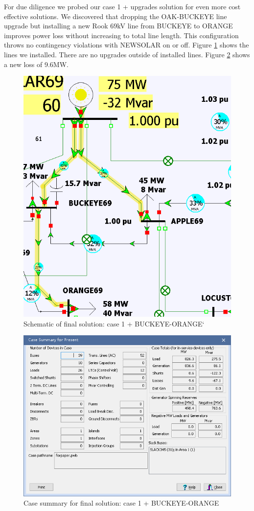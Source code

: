 \documentclass[conference]{IEEEtran}
\begin{document}
For due diligence we probed our case 1 + upgrades solution for even more cost effective solutions. We discovered that dropping the OAK-BUCKEYE line upgrade but installing a new Rook 69kV line from BUCKEYE to ORANGE improves power loss without increasing to total line length. This configuration throws no contingency violations with NEWSOLAR on or off. Figure \ref{fig:case1plusnewline} shows the lines we installed. There are no upgrades outside of installed lines. Figure \ref{fig:case1plusnewlineloss} shows a new loss of 9.6MW. 
\begin{figure}[h]
	\centering
	\includegraphics[width=.7\linewidth]{figures/case1_plusnewline}
	\caption{Schematic of final solution: case 1 + BUCKEYE-ORANGE`}
	\label{fig:case1plusnewline}
\end{figure}
\begin{figure}[h]
	\centering
	\includegraphics[width=1\linewidth]{figures/case1_plusnewline_loss}
	\caption{Case summary for final solution: case 1 + BUCKEYE-ORANGE}
	\label{fig:case1plusnewlineloss}
\end{figure}
\end{document}
